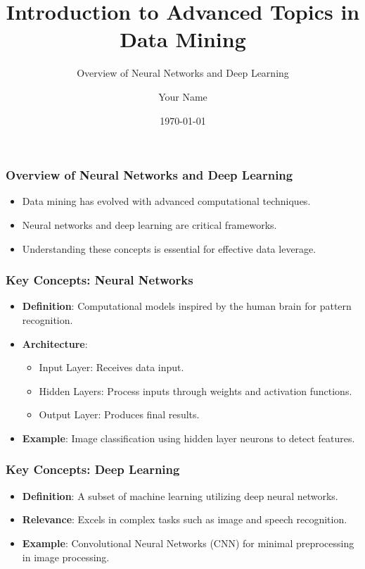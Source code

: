 \documentclass[aspectratio=169]{beamer}
\begin{document}
\frame{\titlepage}

\begin{frame}[fragile]
    \title{Introduction to Advanced Topics in Data Mining}
    \subtitle{Overview of Neural Networks and Deep Learning}
    \author{Your Name}
    \date{\today}
    \titlepage
\end{frame}

\begin{frame}[fragile]
    \frametitle{Overview of Neural Networks and Deep Learning}
    \begin{itemize}
        \item Data mining has evolved with advanced computational techniques.
        \item Neural networks and deep learning are critical frameworks.
        \item Understanding these concepts is essential for effective data leverage.
    \end{itemize}
\end{frame}

\begin{frame}[fragile]
    \frametitle{Key Concepts: Neural Networks}
    \begin{itemize}
        \item \textbf{Definition}: Computational models inspired by the human brain for pattern recognition.
        \item \textbf{Architecture}:
            \begin{itemize}
                \item Input Layer: Receives data input.
                \item Hidden Layers: Process inputs through weights and activation functions.
                \item Output Layer: Produces final results.
            \end{itemize}
        \item \textbf{Example}: Image classification using hidden layer neurons to detect features.
    \end{itemize}
\end{frame}

\begin{frame}[fragile]
    \frametitle{Key Concepts: Deep Learning}
    \begin{itemize}
        \item \textbf{Definition}: A subset of machine learning utilizing deep neural networks.
        \item \textbf{Relevance}: Excels in complex tasks such as image and speech recognition.
        \item \textbf{Example}: Convolutional Neural Networks (CNN) for minimal preprocessing in image processing.
    \end{itemize}
\end{frame}
\end{document}
